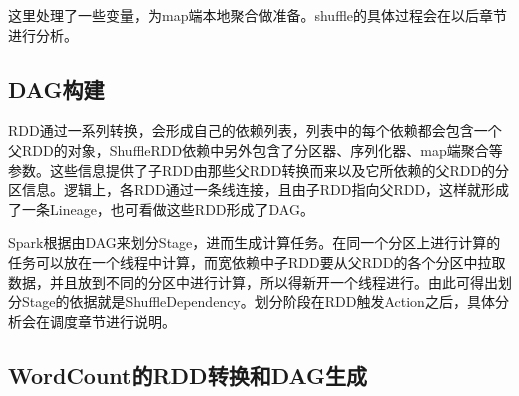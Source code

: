 这里处理了一些变量，为map端本地聚合做准备。shuffle的具体过程会在以后章节进行分析。
\subsection{DAG构建}

RDD通过一系列转换，会形成自己的依赖列表，列表中的每个依赖都会包含一个父RDD的对象，ShuffleRDD依赖中另外包含了分区器、序列化器、map端聚合等参数。这些信息提供了子RDD由那些父RDD转换而来以及它所依赖的父RDD的分区信息。逻辑上，各RDD通过一条线连接，且由子RDD指向父RDD，这样就形成了一条Lineage，也可看做这些RDD形成了DAG。

Spark根据由DAG来划分Stage，进而生成计算任务。在同一个分区上进行计算的任务可以放在一个线程中计算，而宽依赖中子RDD要从父RDD的各个分区中拉取数据，并且放到不同的分区中进行计算，所以得新开一个线程进行。由此可得出划分Stage的依据就是ShuffleDependency。划分阶段在RDD触发Action之后，具体分析会在调度章节进行说明。

\subsection{WordCount的RDD转换和DAG生成}

